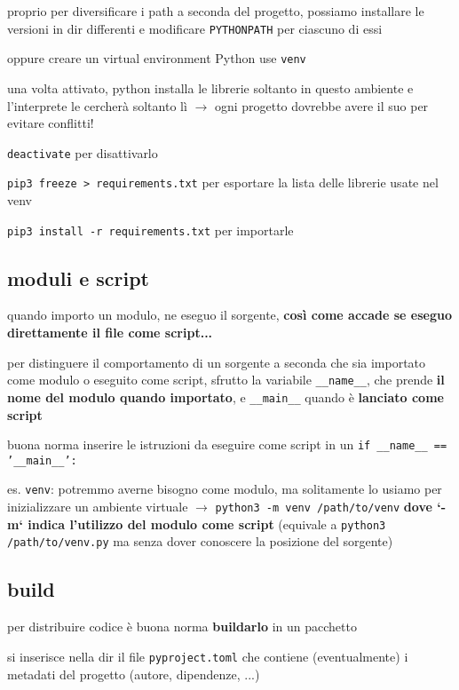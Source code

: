 proprio per diversificare i path a seconda del progetto, possiamo installare le versioni in dir differenti e modificare \texttt{PYTHONPATH} per ciascuno di essi

oppure creare un virtual environment Python use \texttt{venv}  

una volta attivato, python installa le librerie soltanto in questo ambiente e l'interprete le cercher\`a soltanto l\`i $\rightarrow$ ogni progetto dovrebbe avere il suo per evitare conflitti!

\texttt{deactivate} per disattivarlo

\texttt{pip3 freeze > requirements.txt} per esportare la lista delle librerie usate nel venv

\texttt{pip3 install -r requirements.txt} per importarle

\subsection{moduli e script}

quando importo un modulo, ne eseguo il sorgente, \textbf{cos\`i come accade se eseguo direttamente il file come script...}

per distinguere il comportamento di un sorgente a seconda che sia importato come modulo o eseguito come script, sfrutto la variabile \texttt{__name__}, che prende \textbf{il nome del modulo quando importato}, e \texttt{__main__} quando \`e \textbf{lanciato come script}

buona norma inserire le istruzioni da eseguire come script in un \texttt{if __name__ == '__main__':}

es. \texttt{venv}: potremmo averne bisogno come modulo, ma solitamente lo usiamo per inizializzare un ambiente virtuale $\rightarrow$ \texttt{python3 -m venv /path/to/venv} \textbf{dove `-m` indica l'utilizzo del modulo come script} (equivale a \texttt{python3 /path/to/venv.py} ma senza dover conoscere la posizione del sorgente)

\subsection{build}

per distribuire codice \`e buona norma \textbf{buildarlo} in un pacchetto

si inserisce nella dir il file \texttt{pyproject.toml} che contiene (eventualmente) i metadati del progetto (autore, dipendenze, ...)

